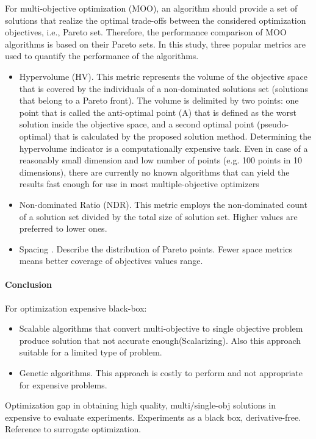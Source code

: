             For multi-objective optimization (MOO), an algorithm should provide a set of solutions that realize the optimal trade-offs between the considered optimization objectives, i.e., Pareto set. Therefore, the performance comparison of MOO algorithms is based on their Pareto sets. In this study, three popular metrics are used to quantify the performance of the algorithms. 
            \begin{itemize}
                \item Hypervolume (HV)\cite{Zitzler2000ComparisonOM}. 
                This metric represents the volume of the objective space that is covered by the individuals of a non-dominated solutions set (solutions that belong to a Pareto front). The volume is delimited by two points: one point that is called the anti-optimal point (A) that is defined as the worst solution inside the objective space, and a second optimal point (pseudo-optimal) that is calculated by the proposed solution method. 
                Determining the hypervolume indicator is a computationally expensive task. Even in case of a reasonably small dimension and low number of points (e.g. 100 points in 10 dimensions), 
                there are currently no known algorithms that can yield the results fast enough for use in most multiple-objective optimizers
                \item Non-dominated Ratio (NDR). This metric employs the non-dominated count of a solution set divided by the total size of solution set. Higher values are preferred to lower ones.
                \item Spacing \cite{Schott1995FaultTD}. Describe the distribution of Pareto points. Fewer space metrics means better coverage of objectives values range.
                
            \end{itemize}

        \paragraph{Conclusion}

            For optimization expensive black-box:
            \begin{itemize}
                \item Scalable algorithms that convert multi-objective to single objective problem produce solution that not accurate enough(Scalarizing). Also this approach suitable for a limited type of problem.
                \item Genetic algorithms. This approach is costly to perform and not appropriate for expensive problems.
            \end{itemize}
            Optimization gap in obtaining high quality, multi/single-obj solutions in expensive to evaluate experiments.
            Experiments as a black box, derivative-free. Reference to surrogate optimization.

